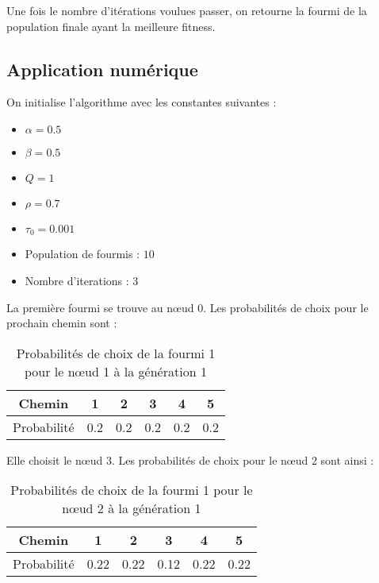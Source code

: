 Une fois le nombre d'itérations voulues passer, on retourne la fourmi de la population finale ayant la meilleure fitness.

\subsection{Application numérique}\label{subsec:application-numerique}

On initialise l'algorithme avec les constantes suivantes :

\begin{itemize}
    \item $\alpha = 0.5$
    \item $\beta = 0.5$
    \item $Q = 1$
    \item $\rho = 0.7$
    \item $\tau_0 = 0.001$
    \item Population de fourmis : $10$
    \item Nombre d'iterations : $3$
\end{itemize}

La première fourmi se trouve au n\oe ud $0$.
Les probabilités de choix pour le prochain chemin sont :


\begin{table}[h!]
    \centering
    \begin{tabular}{|c|c|c|c|c|c|}
        \hline
        Chemin      & 1   & 2   & 3   & 4   & 5   \\
        \hline
        Probabilité & 0.2 & 0.2 & 0.2 & 0.2 & 0.2 \\
        \hline
    \end{tabular}
    \caption{Probabilités de choix de la fourmi 1 pour le n\oe ud 1 à la génération 1}\label{tab:fourmi-1-noeud-1-gen-1}
\end{table}

Elle choisit le n\oe ud $3$.
Les probabilités de choix pour le n\oe ud 2 sont ainsi :

\begin{table}[h!]
    \centering
    \begin{tabular}{|c|c|c|c|c|c|}
        \hline
        Chemin      & 1    & 2    & 3    & 4    & 5    \\
        \hline
        Probabilité & 0.22 & 0.22 & 0.12 & 0.22 & 0.22 \\
        \hline
    \end{tabular}
    \caption{Probabilités de choix de la fourmi 1 pour le n\oe ud 2 à la génération 1}\label{tab:fourmi-1-noeud-2-gen-1}
\end{table}

